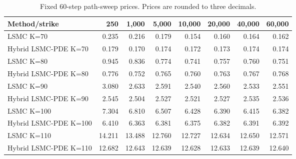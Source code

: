 \begin{table}[htbp]\centering
\caption{Fixed 60-step path-sweep prices. Prices are rounded to three decimals.}
\begin{tabular}{lrrrrrrr}
\toprule
Method/strike & 250 & 1,000 & 5,000 & 10,000 & 20,000 & 40,000 & 60,000 \\
\midrule
LSMC K=70 & 0.235 & 0.216 & 0.179 & 0.154 & 0.160 & 0.164 & 0.162 \\
Hybrid LSMC-PDE K=70 & 0.179 & 0.170 & 0.174 & 0.172 & 0.173 & 0.174 & 0.174 \\
LSMC K=80 & 0.945 & 0.836 & 0.774 & 0.741 & 0.757 & 0.760 & 0.751 \\
Hybrid LSMC-PDE K=80 & 0.776 & 0.752 & 0.765 & 0.760 & 0.763 & 0.767 & 0.768 \\
LSMC K=90 & 3.080 & 2.633 & 2.591 & 2.540 & 2.560 & 2.533 & 2.551 \\
Hybrid LSMC-PDE K=90 & 2.545 & 2.504 & 2.527 & 2.521 & 2.527 & 2.535 & 2.536 \\
LSMC K=100 & 7.304 & 6.810 & 6.507 & 6.428 & 6.390 & 6.415 & 6.382 \\
Hybrid LSMC-PDE K=100 & 6.410 & 6.363 & 6.381 & 6.375 & 6.382 & 6.391 & 6.392 \\
LSMC K=110 & 14.211 & 13.488 & 12.760 & 12.727 & 12.634 & 12.650 & 12.571 \\
Hybrid LSMC-PDE K=110 & 12.682 & 12.643 & 12.639 & 12.628 & 12.633 & 12.639 & 12.640 \\
\bottomrule
\end{tabular}
\end{table}
